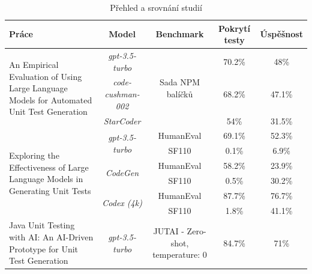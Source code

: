 \documentclass[czech, ma, kiv, he, iso690numb, pdf, viewonly]{fasthesis}
\begin{document}
        \newpage

        \begin{landscape}
            \vspace*{\fill}
            \begin{table}[H]
                \begin{tabular}{|p{6cm}|c|c|c|c|}
                    \hline
                    \textbf{Práce} & \textbf{Model} & \textbf{Benchmark} & \textbf{Pokrytí testy} & \textbf{Úspěšnost} \\
                    \hline
                    \multirow{3}{6cm}{An Empirical Evaluation of Using Large Language Models for Automated Unit Test Generation} & \textit{gpt-3.5-turbo} & \multirow{3}{*}{Sada NPM balíčků} & 70.2\% & 48\% \\
                     & \textit{code-cushman-002} & & 68.2\% & 47.1\% \\
                     & \textit{StarCoder} & & 54\% & 31.5\% \\
                    \hline
                    \multirow{6}{6cm}{Exploring the Effectiveness of Large Language
Models in Generating Unit Tests} & \multirow{2}{*}{\textit{gpt-3.5-turbo}} & HumanEval & 69.1\% & 52.3\% \\
                     & & SF110 & 0.1\% & 6.9\% \\
                     & \multirow{2}{*}{\textit{CodeGen}} & HumanEval & 58.2\% & 23.9\% \\
                     & & SF110 & 0.5\% & 30.2\% \\
                     & \multirow{2}{*}{\textit{Codex (4k)}} & HumanEval & 87.7\% & 76.7\% \\
                     & & SF110 & 1.8\% & 41.1\% \\
                    \hline
                    Java Unit Testing with AI: An AI-Driven Prototype for Unit Test Generation & \textit{gpt-3.5-turbo} & JUTAI - Zero-shot, temperature: \(0\) & 84.7\% & 71\% \\
                    \hline
                \end{tabular}
                \centering
                \caption{Přehled a srovnání studií}
                \label{tab:paper_comp}
            \end{table}
            \vspace*{\fill}

            \pagebreak


\end{landscape}
\end{document}
